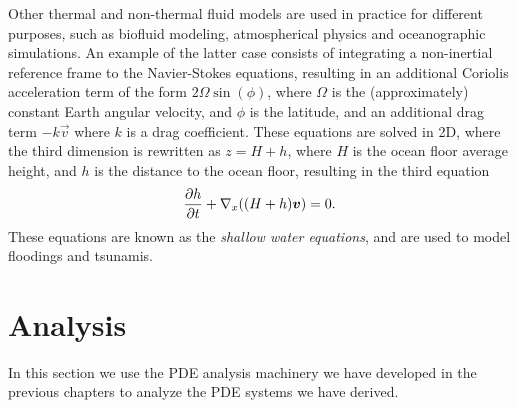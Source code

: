 Other thermal and non-thermal fluid models are used in practice for different purposes, such as biofluid modeling, atmospherical physics and oceanographic simulations. An example of the latter case consists of integrating a non-inertial reference frame to the Navier-Stokes equations, resulting in an additional Coriolis acceleration term of the form $2\Omega \sin(\phi)$, where $\Omega$ is the (approximately) constant Earth angular velocity, and $\phi$ is the latitude, and an additional drag term $-k\vec v$ where $k$ is a drag coefficient. These equations are solved in 2D, where the third dimension is rewritten as $z = H+h$, where $H$ is the ocean floor average height, and $h$ is the distance to the ocean floor, resulting in the third equation
\begin{equation}
    \frac{\partial h}{\partial t} + \vx((H+h)\vec v) = 0.
\end{equation}
These equations are known as the \emph{shallow water equations}, and are used to model floodings and tsunamis.  

\section{Analysis}\label{sec:continuum-analysis}
In this section we use the PDE analysis machinery we have developed in the previous chapters to analyze the PDE systems we have derived.

